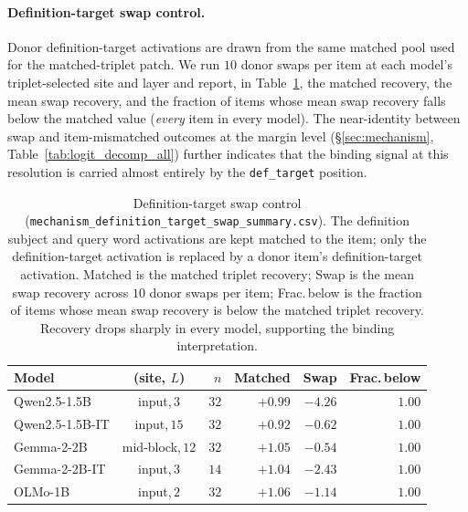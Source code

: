 \documentclass[11pt]{article}
\begin{document}
\paragraph{Definition-target swap control.}
Donor definition-target activations are drawn from the same matched pool used for the
matched-triplet patch. We run $10$ donor swaps per item at each model's triplet-selected
site and layer and report, in Table~\ref{tab:swap_summary}, the matched recovery, the mean
swap recovery, and the fraction of items whose mean swap recovery falls below the matched
value (\emph{every} item in every model). The near-identity between swap and item-mismatched
outcomes at the margin level (\S\ref{sec:mechanism}, Table~\ref{tab:logit_decomp_all})
further indicates that the binding signal at this resolution is carried almost entirely by
the \texttt{def\_target} position.

\begin{table}[H]
\centering
\scriptsize
\setlength{\tabcolsep}{2pt}
\begin{tabular*}{\columnwidth}{@{\extracolsep{\fill}}lcrrrr@{}}
\toprule
Model & (site, $L$) & $n$ & Matched & Swap & Frac.\,below \\
\midrule
Qwen2.5-1.5B    & input,$\,3$     & $32$ & $+0.99$ & $-4.26$ & $1.00$ \\
Qwen2.5-1.5B-IT & input,$\,15$    & $32$ & $+0.92$ & $-0.62$ & $1.00$ \\
Gemma-2-2B      & mid-block,$\,12$ & $32$ & $+1.05$ & $-0.54$ & $1.00$ \\
Gemma-2-2B-IT   & input,$\,3$     & $14$ & $+1.04$ & $-2.43$ & $1.00$ \\
OLMo-1B         & input,$\,2$     & $32$ & $+1.06$ & $-1.14$ & $1.00$ \\
\bottomrule
\end{tabular*}
\caption{Definition-target swap control
(\texttt{mechanism\_definition\_target\_swap\_\allowbreak summary.csv}). The definition subject
and query word activations are kept matched to the item; only the definition-target activation
is replaced by a donor item's definition-target activation. Matched is the matched
triplet recovery; Swap is the mean swap recovery across $10$ donor swaps per item;
Frac.\,below is the fraction of items whose mean swap recovery is below the matched
triplet recovery. Recovery drops sharply in every model, supporting the binding
interpretation.}
\label{tab:swap_summary}
\end{table}
\end{document}
